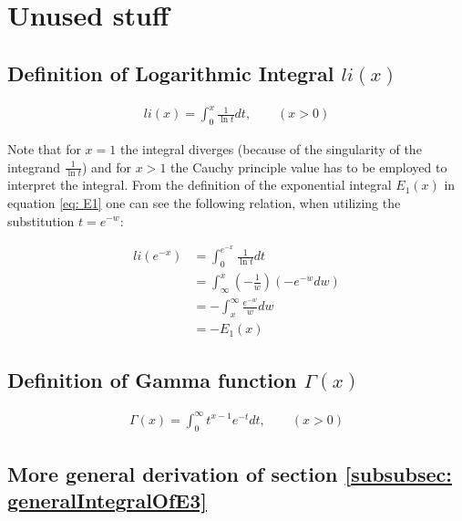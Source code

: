 \documentclass[bibliography=totocnumbered]{scrartcl}
\newcommand{\assume}[1][\text{MISSING PARAMETER}]{,\qquad\left(#1\right)}
\begin{document}
	\clearpage
	\printbibliography
	\clearpage
	\appendix
	
	\section{Unused stuff}
	
		\subsection[Definition of Logarithmic Integral li(x)]{Definition of Logarithmic Integral $li\left(x\right)$}
		\label{appsubsec: li}
		
			\begin{gather}
			li\left(x\right)=\int_{0}^{x}\frac{1}{\ln{t}}dt\assume[x>0]\label{eq: li}
			\end{gather}
			
			Note that for $x=1$ the integral diverges (because of the singularity of the integrand $\frac{1}{\ln{t}}$) and for $x>1$ the Cauchy principle value has to be employed to interpret the integral. From the definition of the exponential integral $E_1\left(x\right)$ in equation \eqref{eq: E1} one can see the following relation, when utilizing the substitution $t=e^{-w}$:
			
			\begin{align}
			li\left(e^{-x}\right)&=\int_{0}^{e^{-x}}\frac{1}{\ln{t}}dt\\
			&=\int_{\infty}^{x}\left(-\frac{1}{w}\right)\left(-e^{-w}dw\right)\\
			&=-\int_{x}^{\infty}\frac{e^{-w}}{w}dw\\
			&=-E_1\left(x\right)
			\end{align}
		
		\subsection[Definition of Gamma function]{Definition of Gamma function $\Gamma\left(x\right)$}
		\label{appsubsec: Gamma}
		
			\begin{gather}
			\Gamma\left(x\right)=\int_{0}^{\infty}t^{x-1}e^{-t}dt\assume[x>0]\label{eq: Gamma}
			\end{gather}
		
		\subsection{More general derivation of section \ref{subsubsec: generalIntegralOfE3}}
		\label{appsec: moreGeneralDerivation1}
		
\end{document}
